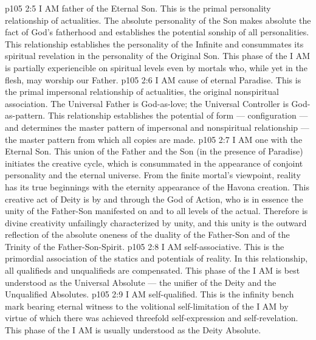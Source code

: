 \vs p105 2:5 \bibnobreakspace {} I AM father of the Eternal Son. This is the primal personality relationship of actualities. The absolute personality of the Son makes absolute the fact of God’s fatherhood and establishes the potential sonship of all personalities. This relationship establishes the personality of the Infinite and consummates its spiritual revelation in the personality of the Original Son. This phase of the I AM is partially experiencible on spiritual levels even by mortals who, while yet in the flesh, may worship our Father.
\vs p105 2:6 \pc {}\bibnobreakspace {} I AM cause of eternal Paradise. This is the primal impersonal relationship of actualities, the original nonspiritual association. The Universal Father is God\hyp{}as\hyp{}love; the Universal Controller is God\hyp{}as\hyp{}pattern. This relationship establishes the potential of form --- configuration --- and determines the master pattern of impersonal and nonspiritual relationship --- the master pattern from which all copies are made.
\vs p105 2:7 \pc {}\bibnobreakspace {} I AM one with the Eternal Son. This union of the Father and the Son (in the presence of Paradise) initiates the creative cycle, which is consummated in the appearance of conjoint personality and the eternal universe. From the finite mortal’s viewpoint, reality has its true beginnings with the eternity appearance of the Havona creation. This creative act of Deity is by and through the God of Action, who is in essence the unity of the Father\hyp{}Son manifested on and to all levels of the actual. Therefore is divine creativity unfailingly characterized by unity, and this unity is the outward reflection of the absolute oneness of the duality of the Father\hyp{}Son and of the Trinity of the Father\hyp{}Son\hyp{}Spirit.
\vs p105 2:8 \pc {}\bibnobreakspace {} I AM self\hyp{}associative. This is the primordial association of the statics and potentials of reality. In this relationship, all qualifieds and unqualifieds are compensated. This phase of the I AM is best understood as the Universal Absolute --- the unifier of the Deity and the Unqualified Absolutes.
\vs p105 2:9 \pc {}\bibnobreakspace {} I AM self\hyp{}qualified. This is the infinity bench mark bearing eternal witness to the volitional self\hyp{}limitation of the I AM by virtue of which there was achieved threefold self\hyp{}expression and self\hyp{}revelation. This phase of the I AM is usually understood as the Deity Absolute.
